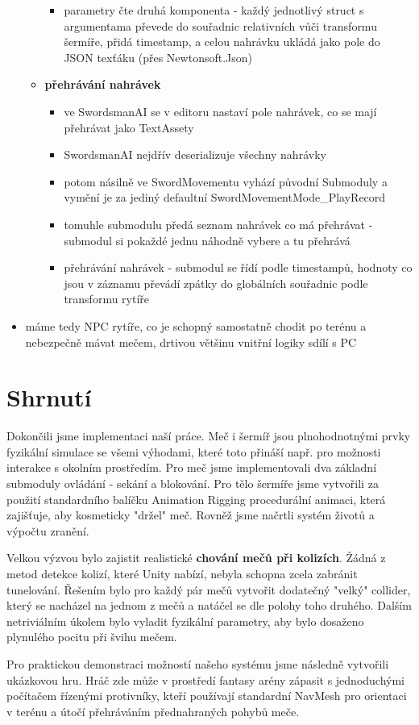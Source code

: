 \begin{itemize}
\begin{itemize}
\begin{itemize}
            \item parametry čte druhá komponenta - každý jednotlivý struct s argumentama převede do souřadnic relativních vůči transformu šermíře, přidá timestamp, a celou nahrávku ukládá jako pole do JSON texťáku (přes Newtonsoft.Json)
          \end{itemize}
        \item \textbf{přehrávání nahrávek}
          \begin{itemize}
            \item ve SwordsmanAI se v editoru nastaví pole nahrávek, co se mají přehrávat jako TextAssety
            \item SwordsmanAI nejdřív deserializuje všechny nahrávky
            \item potom násilně ve SwordMovementu vyhází původní Submoduly a vymění je za jediný defaultní SwordMovementMode\_PlayRecord
            \item tomuhle submodulu předá seznam nahrávek co má přehrávat - submodul si pokaždé jednu náhodně vybere a tu přehrává
            \item přehrávání nahrávek - submodul se řídí podle timestampů, hodnoty co jsou v záznamu převádí zpátky do globálních souřadnic podle transformu rytíře
          \end{itemize}
      \end{itemize}
    \item máme tedy \acs{NPC} rytíře, co je schopný samostatně chodit po terénu a nebezpečně mávat mečem, drtivou většinu vnitřní logiky sdílí s \acs{PC}
\end{itemize}


\section{Shrnutí}

Dokončili jsme implementaci naší práce. Meč i šermíř jsou plnohodnotnými prvky fyzikální simulace se všemi výhodami, které toto přináší např. pro možnosti interakce s okolním prostředím. Pro meč jsme implementovali dva základní submoduly ovládání - sekání a blokování. Pro tělo šermíře jsme vytvořili za použití standardního balíčku Animation Rigging procedurální animaci, která zajišťuje, aby kosmeticky "držel" meč. Rovněž jsme načrtli systém životů a výpočtu zranění.

Velkou výzvou bylo zajistit realistické \textbf{chování mečů při kolizích}. Žádná z metod detekce kolizí, které Unity nabízí, nebyla schopna zcela zabránit tunelování. Řešením bylo pro každý pár mečů vytvořit dodatečný "velký" collider, který se nacházel na jednom z mečů a natáčel se dle polohy toho druhého. Dalším netriviálním úkolem bylo vyladit fyzikální parametry, aby bylo dosaženo plynulého pocitu při švihu mečem. 

Pro praktickou demonstraci možností našeho systému jsme následně vytvořili ukázkovou hru. Hráč zde může v prostředí fantasy arény zápasit s jednoduchými počítačem řízenými protivníky, kteří používají standardní NavMesh pro orientaci v terénu a útočí přehráváním přednahraných pohybů meče. 
